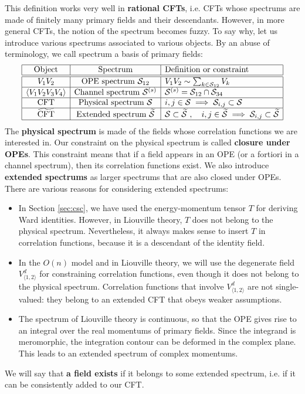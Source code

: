 \documentclass[12pt, a4paper]{article}
\theoremstyle{break}
\begin{document}
This definition works very well in \textbf{rational CFTs}, i.e. CFTs whose spectrums are made of finitely many primary fields and their descendants. However, in more general CFTs, the notion of the spectrum becomes fuzzy. To say why, let us introduce various spectrums associated to various objects. By an abuse of terminology, we call spectrum a basis of primary fields: 
\begin{align}
 \begin{array}{|c|c|l|}
  \hline 
  \text{Object} & \text{Spectrum}  & \text{Definition or constraint}
  \\
  \hline \hline 
  V_1V_2 & \text{OPE spectrum } \mathcal{S}_{12} & V_1V_2 \sim \sum_{k\in \mathcal{S}_{12}} V_k 
  \\
  \hline 
  \left<V_1V_2V_3V_4\right> & \text{Channel spectrum } \mathcal{S}^{(s)} &  \mathcal{S}^{(s)}= \mathcal{S}_{12}\cap \mathcal{S}_{34}
  \\
  \hline 
  \text{CFT} & \text{Physical spectrum } \mathcal{S} &  i,j\in\mathcal{S}\implies \mathcal{S}_{i,j}\subset \mathcal{S}  
  \\
  \hline 
  \widetilde{\text{CFT}} & \text{Extended spectrum } \widetilde{\mathcal{S}} & \mathcal{S}\subset \widetilde{\mathcal{S}}\ , \quad i,j\in\widetilde{\mathcal{S}}\implies \mathcal{S}_{i,j}\subset \widetilde{\mathcal{S}}
  \\
  \hline 
 \end{array}
 \label{specs}
\end{align}
The \textbf{physical spectrum} is made of the fields whose correlation functions we are interested in. Our constraint on the physical spectrum is called \textbf{closure under OPEs}. This constraint means that if a field appears in an OPE (or a fortiori in a channel spectrum), then its correlation functions exist. 
We also introduce \textbf{extended spectrums} as larger spectrums that are also closed under OPEs. There are various reasons for considering extended spectrums:
\begin{itemize}
 \item In Section \ref{sec:csc}, we have used the energy-momentum tensor $T$ for deriving Ward identities. However, in Liouville theory, $T$ does not belong to the physical spectrum. Nevertheless, it always makes sense to insert $T$ in correlation functions, because it is a descendant of the identity field. 
 \item In the $O(n)$ model and in Liouville theory, we will use the degenerate field $V^d_{\langle 1,2\rangle}$ for constraining correlation functions, even though it does not belong to the physical spectrum. Correlation functions that involve $V^d_{\langle 1,2\rangle}$ are not single-valued: they belong to an extended CFT that obeys weaker assumptions. 
 \item The spectrum of Liouville theory is continuous, so that the OPE gives rise to an integral over the real momentums of primary fields. Since the integrand is meromorphic, the integration contour can be deformed in the complex plane. This leads to an extended spectrum of complex momentums. 
\end{itemize}
We will say that \textbf{a field exists} if it belongs to some extended spectrum, i.e. if it can be consistently added to our CFT. 
\end{document}
